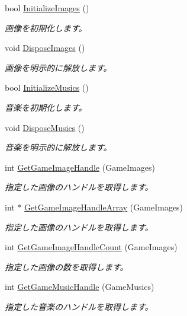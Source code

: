 \begin{DoxyCompactItemize}
\item 
bool \hyperlink{class_game_resourse_manager_a552197bd5bedfd03a9139fcf55b2e517}{Initialize\+Images} ()
\begin{DoxyCompactList}\small\item\em 画像を初期化します。\end{DoxyCompactList}\item 
void \hyperlink{class_game_resourse_manager_a443b0918312674650773d73f671979c8}{Dispose\+Images} ()
\begin{DoxyCompactList}\small\item\em 画像を明示的に解放します。\end{DoxyCompactList}\item 
bool \hyperlink{class_game_resourse_manager_a37f10ff42b21ff8045e663f7bc9a8098}{Initialize\+Musics} ()
\begin{DoxyCompactList}\small\item\em 音楽を初期化します。\end{DoxyCompactList}\item 
void \hyperlink{class_game_resourse_manager_aa3bc2345617c007e3c7d5fb82a8c7a30}{Dispose\+Musics} ()
\begin{DoxyCompactList}\small\item\em 音楽を明示的に解放します。\end{DoxyCompactList}\item 
int \hyperlink{class_game_resourse_manager_a3dff92a4927e47f9fba92b7be03a58bb}{Get\+Game\+Image\+Handle} (Game\+Images)
\begin{DoxyCompactList}\small\item\em 指定した画像のハンドルを取得します。\end{DoxyCompactList}\item 
int $\ast$ \hyperlink{class_game_resourse_manager_ad998a6963f836fc32dd229dd956b6aba}{Get\+Game\+Image\+Handle\+Array} (Game\+Images)
\begin{DoxyCompactList}\small\item\em 指定した画像のハンドルを取得します。\end{DoxyCompactList}\item 
int \hyperlink{class_game_resourse_manager_ae5f3e1954ed171adb29816f065589299}{Get\+Game\+Image\+Handle\+Count} (Game\+Images)
\begin{DoxyCompactList}\small\item\em 指定した画像の数を取得します。\end{DoxyCompactList}\item 
int \hyperlink{class_game_resourse_manager_a608fd6d01fbf83b419697f1ea9a285cf}{Get\+Game\+Music\+Handle} (Game\+Musics)
\begin{DoxyCompactList}\small\item\em 指定した音楽のハンドルを取得します。\end{DoxyCompactList}\end{DoxyCompactItemize}
